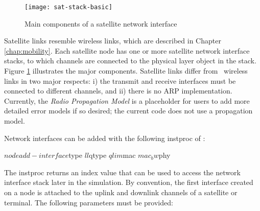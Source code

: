 \begin{figure}
    \centerline{\texttt{[image: sat-stack-basic]}}
    \caption{Main components of a satellite network interface}
    \label{fig:sat-stack-basic}
\end{figure}

Satellite links resemble wireless links, which are described in Chapter
\ref{chap:mobility}.  Each satellite
node has one or more satellite network interface stacks, to which
channels are connected to the physical layer object in the stack.  Figure
\ref{fig:sat-stack-basic} illustrates the major components.  Satellite
links differ from \ns~wireless links in two major respects:  i) the
transmit and receive interfaces must be connected to different channels,
and ii) there is no ARP implementation.  Currently, the {\em
Radio Propagation Model} is a placeholder for users to add more detailed
error models if so desired; the current code does not use a propagation
model.

Network interfaces can be added with the following instproc of
:
\begin{program}
$node add-interface $type $ll $qtype $qlim $mac $mac_bw $phy
\end{program}
The  instproc returns an index value that can be used
to access the network interface stack later in the simulation.  By convention,
the first interface created on a node is attached to the uplink and downlink
channels of a satellite or terminal.  The
following parameters must be provided:

